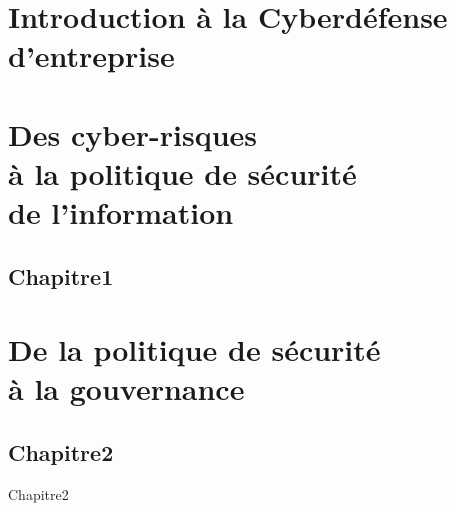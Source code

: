 


\part[Cyber-généralités]{Introduction à la Cyberdéfense d'entreprise}




\part[CyberRisques]{Des cyber-risques \\à la politique de sécurité \\de l'information}

\chapter{Chapitre1}





\part[Mesures de sécurité]{De la politique de sécurité \\à la gouvernance}

\chapter{Chapitre2}
Chapitre2





